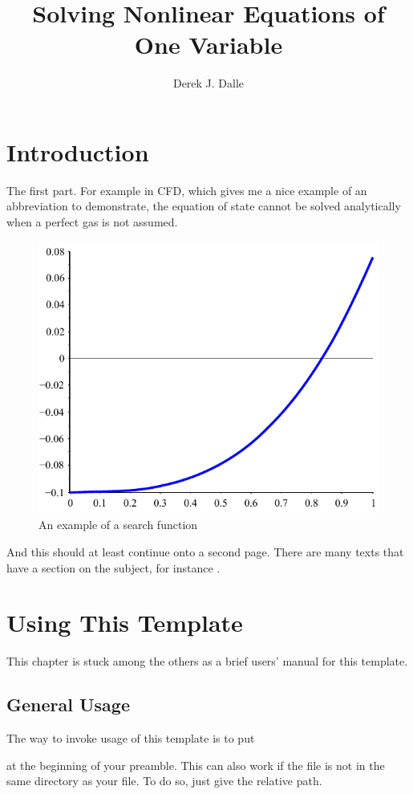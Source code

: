 \documentclass[thesis]{./tex/thesis-umich}
\title{Solving Nonlinear Equations of One Variable}
\author{Derek J. Dalle}
\begin{document}
\chapter{Introduction}   \label{chap:intro}
The first part.  For example in \ac{CFD}, which gives me a nice
example of an abbreviation to demonstrate, the equation of state
cannot be solved analytically when a perfect gas is not assumed.

\begin{figure}
 \begin{center}
  \includegraphics[scale=1]{./pics/f1_plain.pdf}
 \end{center}
 \caption{ \label{fig:fn:1}
  An example of a search function}
\end{figure}

\newpage

And this should at least continue onto a second page.  There are many
texts that have a section on the subject, for instance
\cite{chapra:2002:numerics}.

\chapter{Using This Template}
This chapter is stuck among the others as a brief users' manual for this
template.

\section{General Usage}
The way to invoke usage of this template is to put
at the beginning of your preamble.  This can also work if the
 file is not in the same directory as your
 file.  To do so, just give the relative path.
\end{document}
